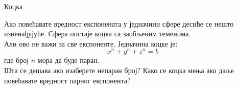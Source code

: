 \documentclass[sr]{./../../common/SurferDesc}%
\begin{document}
\footnotesize
%

\begin{surferPage}
  \begin{surferTitle}Коцка\end{surferTitle}
   \begin{surferText}
   
Ако повећавате вредност експонената у једначини сфере десиће се нешто изненађујуће. Сфера постаје коцка са заобљеним теменима.\\
\vspace{0.3cm}
Али ово не важи за све експоненте. Једначина коцке је:
\[x^n+y^n+z^n=b\]
где број $n$ мора да буде паран.\\
\vspace{0.3cm}
Шта се дешава ако изаберете непаран број? Како се коцка мења ако даље повећавате вредност парног експонента?
     \end{surferText}
\end{surferPage}
\end{document}
